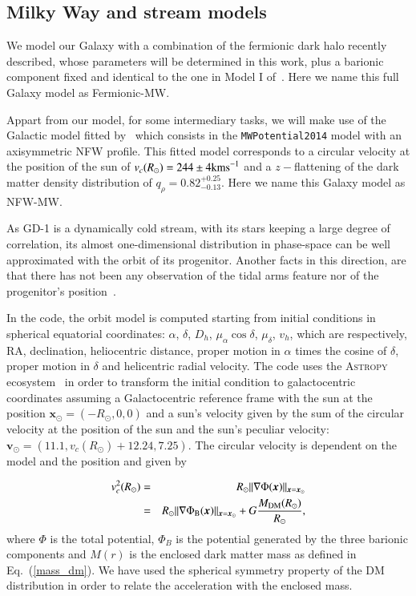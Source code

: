 \documentclass[twocolumn]{aa}
\begin{document}
\subsection{Milky Way and stream models}

We model our Galaxy with a combination of the fermionic dark halo recently described, whose parameters will be determined in this work, plus a barionic component fixed and identical to the one in Model I of~\citet{2017A&A...598A..66P}. Here we name this full Galaxy model as Fermionic-MW.

Appart from our model, for some intermediary tasks, we will make use of the Galactic model fitted
by~\citet{2019MNRAS.486.2995M} which consists in the {\texttt{MWPotential2014}}
model with an axisymmetric NFW profile. This fitted model corresponds to a circular velocity at the position of the sun of
$v_c(R_\odot)=244 \pm 4 \rm{ km s}^{-1}$ and a $z-$flattening of the dark matter density distribution of $q_\rho=0.82^{+0.25}_{-0.13}$. Here we name this Galaxy model as NFW-MW.

As GD-1 is a dynamically cold stream, with its stars keeping a large degree of correlation, its almost
one-dimensional distribution in phase-space can be well approximated with the orbit of its progenitor.
Another facts in this direction, are that there has not been any observation of the tidal arms feature
nor of the progenitor's position~\citep{2019MNRAS.486.2995M,10.1093/mnras/sty677,10.1093/mnras/sty1338,Price-Whelan_2018}.

In the code, the orbit model is computed starting from initial conditions in spherical equatorial coordinates:
$\alpha$, $\delta$, $D_h$, $\mu_\alpha \cos\delta$, $\mu_\delta$, $v_h$, which are respectively, RA, declination, heliocentric distance, proper motion in $\alpha$ times the cosine of $\delta$, proper motion in $\delta$ and helicentric radial velocity.
The code uses the {\scshape{Astropy}} ecosystem~\citep{astropy:2022, astropy:2018, astropy:2013} in order to transform the initial condition to galactocentric coordinates assuming a Galactocentric reference frame with the sun at the position $\boldsymbol{x}_\odot=(-R_\odot,0,0)$ and a sun's velocity given by the sum of the circular velocity at the position of the sun and
the sun's peculiar velocity: $\boldsymbol{v}_\odot=(11.1, v_c(R_\odot)+12.24, 7.25)$. The circular velocity is dependent on the model and the position and given by

\begin{eqnarray}
   v_c^2(R_\odot)&=& R_\odot||\nabla \Phi(\boldsymbol{x})||_{\boldsymbol{x}=\boldsymbol{x}_\odot}\nonumber\\
   &=& R_\odot||\nabla \Phi_{\rm{B}}(\boldsymbol{x})||_{\boldsymbol{x}=\boldsymbol{x}_\odot}+
   G \frac{M_{\rm{DM}}(R_\odot)}{R_\odot},
\end{eqnarray}
where $\Phi$ is the total potential, $\Phi_B$ is the potential generated by the three barionic components and $M(r)$ is the enclosed dark matter mass as defined in Eq.~(\ref{mass_dm}). We have used the spherical symmetry property of the DM distribution in order to relate the acceleration with the enclosed mass.
\end{document}
